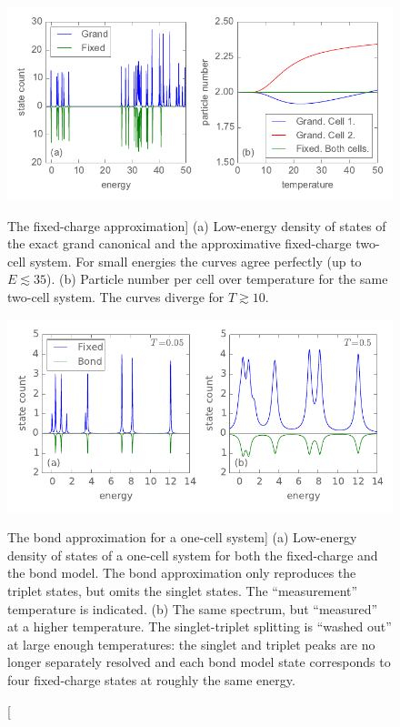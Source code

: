 \begin{figure}
  \center
  \includegraphics{fixed_charge_approximation}
  \caption
  [The fixed-charge approximation]
  {
  (a) Low-energy density of states of the exact grand canonical and the
  approximative fixed-charge two-cell  system. For small energies the
  curves agree perfectly (up to $E \lesssim 35$). (b) Particle number per cell
  over temperature for the same two-cell system. The curves diverge for $T
  \gtrsim 10$.
  }
  \label{fig:fixed_charge_approximation}
 
  \vspace*{0.75cm}

  \includegraphics{bond_approximation1}
  \caption
  [The bond approximation for a one-cell system]
  {
  (a) Low-energy density of states of a one-cell  system for both the
  fixed-charge and the bond model. The bond approximation only reproduces the
  triplet states, but omits the singlet states. The ``measurement'' temperature
  is indicated. (b) The same spectrum, but ``measured'' at a higher temperature.
  The singlet-triplet splitting is ``washed out'' at large enough temperatures:
  the singlet and triplet peaks are no longer separately resolved and each bond
  model state corresponds to four fixed-charge states at roughly the same
  energy.
  }
  \label{fig:bond_approximation1}
\end{figure}


